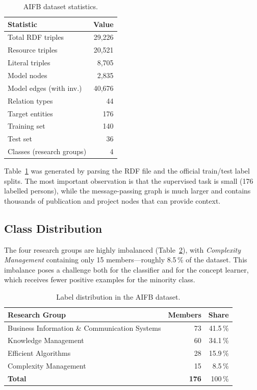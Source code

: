 \documentclass[runningheads]{llncs}
\begin{document}
\begin{table}[ht]
\centering
\caption{AIFB dataset statistics.}
\label{tab:dataset}
\begin{tabular}{lr}
\toprule
\textbf{Statistic} & \textbf{Value} \\
\midrule
Total RDF triples       & 29,226 \\
Resource triples        & 20,521 \\
Literal triples         & 8,705  \\
Model nodes             & 2,835  \\
Model edges (with inv.) & 40,676 \\
Relation types          & 44     \\
Target entities         & 176    \\
\quad Training set      & 140    \\
\quad Test set          & 36     \\
Classes (research groups) & 4    \\
\bottomrule
\end{tabular}
\end{table}

Table~\ref{tab:dataset} was generated by parsing the RDF file and the official train/test label splits.
The most important observation is that the supervised task is small (176 labelled persons), while the
message-passing graph is much larger and contains thousands of publication and project nodes that can
provide context.

\subsection{Class Distribution}

The four research groups are highly imbalanced (Table~\ref{tab:labels}),
with \emph{Complexity Management} containing only 15 members---roughly 8.5\,\% of the dataset.
This imbalance poses a challenge both for the classifier and for the concept learner,
which receives fewer positive examples for the minority class.

\begin{table}[ht]
\centering
\caption{Label distribution in the AIFB dataset.}
\label{tab:labels}
\begin{tabular}{lrr}
\toprule
\textbf{Research Group} & \textbf{Members} & \textbf{Share} \\
\midrule
Business Information \& Communication Systems & 73 & 41.5\,\% \\
Knowledge Management                          & 60 & 34.1\,\% \\
Efficient Algorithms                          & 28 & 15.9\,\% \\
Complexity Management                         & 15 &  8.5\,\% \\
\midrule
\textbf{Total}                                & \textbf{176} & 100\,\% \\
\bottomrule
\end{tabular}
\end{table}
\end{document}
